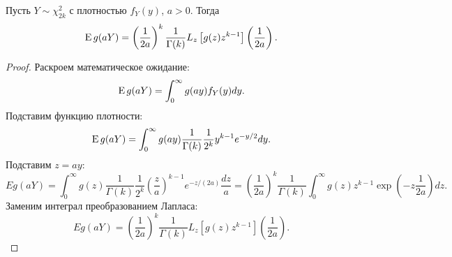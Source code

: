 \documentclass[../paper.tex]{subfiles}
\begin{document}
\begin{Lem}
\label{chisq-laplace}
Пусть $Y \sim \chi^2_{2k}$ с плотностью $f_Y(y)$, $a > 0$.
Тогда
\[
	\operatorname{E} g(aY) = \left(\frac{1}{2a}\right)^k \frac{1}{\Gamma(k)} L_z \left[ g(z) z^{k-1}  \right] \left( \frac{1}{2a} \right) 
.\]
\end{Lem}
\begin{proof}
Раскроем математическое ожидание:
\[
	\operatorname{E} g(aY) = \int_{0}^{\infty} g(ay) f_Y(y) dy  
.\]
Подставим функцию плотности:
\[
	\operatorname{E} g(aY) = \int_{0}^{\infty} g(ay) \frac{1}{\Gamma(k)} \frac{1}{2^k} y^{k-1} e^{-y/2} dy 
.\]
Подставим $z = ay$:
\[
	Eg(aY)
	= \int_0^\infty g(z) \frac{1}{\Gamma(k)} \frac{1}{2^k} \left( \frac{z}{a} \right)^{k-1} e^{-z/(2a)} \frac{dz}{a}
	= \left( \frac{1}{2a} \right)^k \frac{1}{\Gamma(k)} \int_{0}^{\infty} g(z) z^{k-1} \exp\left(-z \frac{1}{2a}\right) dz
.\]
Заменим интеграл преобразованием Лапласа:
\[
	Eg(aY)
	= \left( \frac{1}{2a} \right)^k \frac{1}{\Gamma(k)} L_z \left[ g(z) z^{k-1} \right] \left( \frac{1}{2a} \right) 
.\]
\end{proof}
\end{document}
